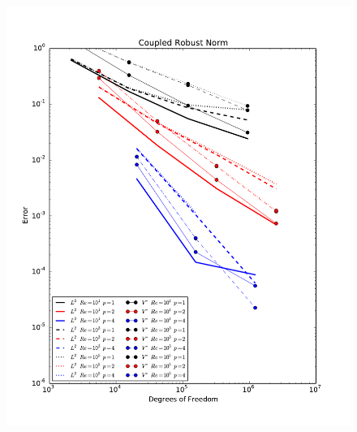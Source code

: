 \documentclass[18pt,xcolor=table]{beamer}
\begin{document}
\begin{frame}[t]
\begin{columns}
\begin{column}{0.6\textwidth}
\begin{figure}
\includegraphics[width=\textwidth]{Incompressible/TaylorGreen/coupledrobust_convergence.pdf}
\end{figure}
\end{column}
\end{columns}
\end{frame}
\end{document}
